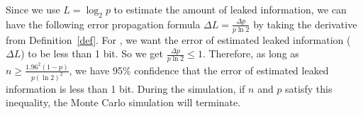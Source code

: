 Since we use $L = \log_{2}p$ to estimate the amount of leaked information, we
can have the following error propagation formula $\Delta L = \frac{\Delta
p}{p\ln2}$ by taking the derivative from Definition~\ref{def}. For \tool, we want the error of estimated leaked
information ($\Delta L$) to be less than 1 bit. So we get $\frac{\Delta
p}{p\ln2} \leq 1$. Therefore, as long as $ n \geq \frac{1.96^2(1-p)}{p(\ln2)^2}$, we have
95\% confidence that the error of estimated leaked information is less than 1 bit.
During the simulation, if $n$ and $p$ satisfy this inequality, the Monte Carlo
simulation will terminate.